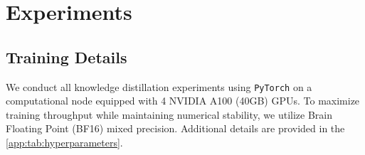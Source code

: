\documentclass{article}
\theoremstyle{plain}
\theoremstyle{definition}
\theoremstyle{remark}
\begin{document}



\section{Experiments}

\subsection{Training Details}
\label{app:sec:training_details}

We conduct all knowledge distillation experiments using \texttt{PyTorch} on a computational node equipped with 4 NVIDIA A100 (40GB) GPUs. 
To maximize training throughput while maintaining numerical stability, we utilize Brain Floating Point (BF16) mixed precision.
Additional details are provided in the \cref{app:tab:hyperparameters}.
\end{document}
